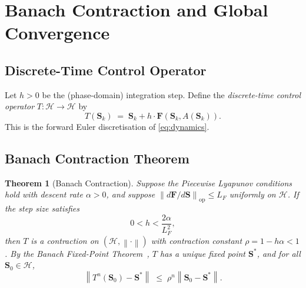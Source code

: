 \documentclass[10pt,twocolumn]{article}
\theoremstyle{plain}
\newtheorem{theorem}{Theorem}[section]
\theoremstyle{definition}
\theoremstyle{remark}
\newcommand{\Hcal}{\mathcal{H}}
\newcommand{\norm}[1]{\left\|#1\right\|}
\newcommand{\Sstar}{\mathbf{S}^{*}}
\begin{document}
\section{Banach Contraction and Global Convergence}
\label{sec:banach}

\subsection{Discrete-Time Control Operator}
\label{ssec:dtop}

Let $h > 0$ be the (phase-domain) integration step.  Define the
\emph{discrete-time control operator} $T: \Hcal \to \Hcal$ by
\begin{equation}
  T(\mathbf{S}_k) \;=\; \mathbf{S}_k + h\cdot\mathbf{F}
                        \!\left(\mathbf{S}_k, A(\mathbf{S}_k)\right).
  \label{eq:dtop}
\end{equation}
This is the forward Euler discretisation of \eqref{eq:dynamics}.

\subsection{Banach Contraction Theorem}
\label{ssec:banachthm}

\begin{theorem}[Banach Contraction]
\label{thm:banach}
Suppose the Piecewise Lyapunov conditions hold with descent rate
$\alpha > 0$, and suppose $\norm{d\mathbf{F}/d\mathbf{S}}_{\mathrm{op}}
\leq L_F$ uniformly on $\Hcal$.  If the step size satisfies
\begin{equation}
  0 < h < \frac{2\alpha}{L_F^2},
  \label{eq:stepsize}
\end{equation}
then $T$ is a contraction on $(\Hcal, \norm{\cdot})$ with contraction
constant $\rho = 1 - h\alpha < 1$.  By the Banach Fixed-Point
Theorem~\cite{Kreyszig1989}, $T$ has a unique fixed point $\Sstar$,
and for all $\mathbf{S}_0 \in \Hcal$,
\begin{equation}
  \norm{T^n(\mathbf{S}_0) - \Sstar}
  \;\leq\; \rho^n \norm{\mathbf{S}_0 - \Sstar}.
  \label{eq:geometric}
\end{equation}
\end{theorem}
\end{document}
